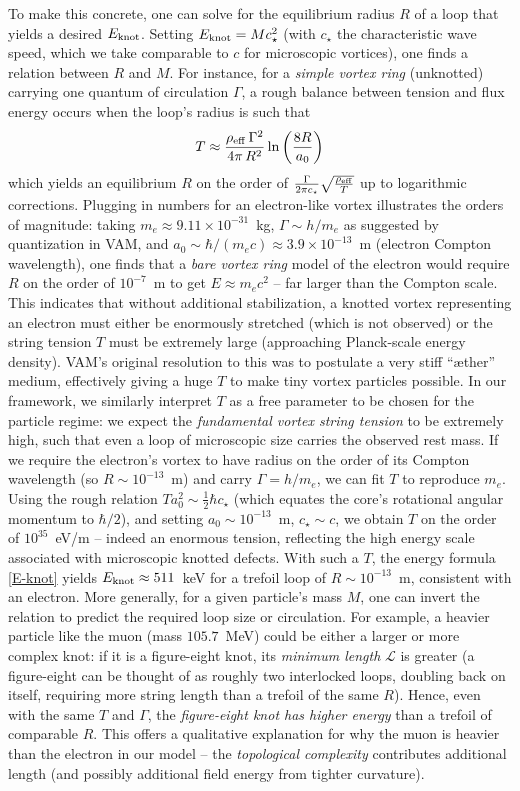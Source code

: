 \documentclass[12pt]{article}
\begin{document}
To make this concrete, one can solve for the equilibrium radius $R$ of a loop that yields a desired $E_{\rm knot}$. Setting $E_{\rm knot} = M c_{\star}^2$ (with $c_{\star}$ the characteristic wave speed, which we take comparable to $c$ for microscopic vortices), one finds a relation between $R$ and $M$. For instance, for a \emph{simple vortex ring} (unknotted) carrying one quantum of circulation $\Gamma$, a rough balance between tension and flux energy occurs when the loop’s radius is such that
\[
T \approx \frac{\rho_{\rm eff}\,\Gamma^2}{4\pi\,R^2}\ln\left(\frac{8R}{a_0}\right)
\]
which yields an equilibrium $R$ on the order of $\frac{\Gamma}{2\pi c_{\star}}\sqrt{\frac{\rho_{\rm eff}}{T}}$ up to logarithmic corrections. Plugging in numbers for an electron-like vortex illustrates the orders of magnitude: taking $m_e \approx 9.11\times10^{-31}$~kg, $\Gamma \sim h/m_e$ as suggested by quantization in VAM, and $a_0 \sim \hbar/(m_e c) \approx 3.9\times10^{-13}$~m (electron Compton wavelength), one finds that a \emph{bare vortex ring} model of the electron would require $R$ on the order of $10^{-7}$~m to get $E \approx m_e c^2$ – far larger than the Compton scale. This indicates that without additional stabilization, a knotted vortex representing an electron must either be enormously stretched (which is not observed) or the string tension $T$ must be extremely large (approaching Planck-scale energy density). VAM’s original resolution to this was to postulate a very stiff “æther” medium, effectively giving a huge $T$ to make tiny vortex particles possible. In our framework, we similarly interpret $T$ as a free parameter to be chosen for the particle regime: we expect the \emph{fundamental vortex string tension} to be extremely high, such that even a loop of microscopic size carries the observed rest mass. If we require the electron’s vortex to have radius on the order of its Compton wavelength (so $R \sim 10^{-13}$~m) and carry $\Gamma = h/m_e$, we can fit $T$ to reproduce $m_e$. Using the rough relation $T a_0^2 \sim \frac{1}{2}\hbar c_{\star}$ (which equates the core’s rotational angular momentum to $\hbar/2$), and setting $a_0 \sim 10^{-13}$~m, $c_{\star}\sim c$, we obtain $T$ on the order of $10^{35}$~eV/m – indeed an enormous tension, reflecting the high energy scale associated with microscopic knotted defects. With such a $T$, the energy formula \eqref{E-knot} yields $E_{\rm knot}\approx 511$~keV for a trefoil loop of $R\sim10^{-13}$~m, consistent with an electron. More generally, for a given particle’s mass $M$, one can invert the relation to predict the required loop size or circulation. For example, a heavier particle like the muon (mass $105.7$~MeV) could be either a larger or more complex knot: if it is a figure-eight knot, its \emph{minimum length} $\mathcal{L}$ is greater (a figure-eight can be thought of as roughly two interlocked loops, doubling back on itself, requiring more string length than a trefoil of the same $R$). Hence, even with the same $T$ and $\Gamma$, the \emph{figure-eight knot has higher energy} than a trefoil of comparable $R$. This offers a qualitative explanation for why the muon is heavier than the electron in our model – the \emph{topological complexity} contributes additional length (and possibly additional field energy from tighter curvature). 
\end{document}
